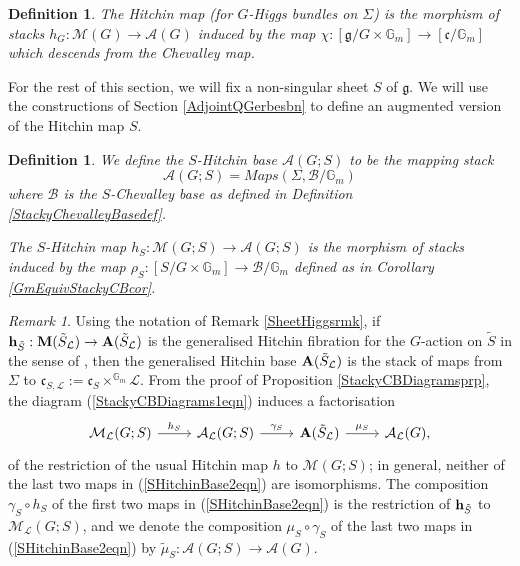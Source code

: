 \documentclass{amsart}
\newtheorem{definition}[theorem]{Definition}
\theoremstyle{remark}
\newtheorem{remark}[theorem]{Remark}
\numberwithin{theorem}{section}
\numberwithin{equation}{section}
\begin{document}
\begin{definition}\label{HitchinMapdef}
    The \emph{Hitchin map} (for $G$-Higgs bundles on $\Sigma$) is the morphism of stacks $h_G:\mathcal M(G) \rightarrow \mathcal A(G)$ induced by the map $\chi:[\mathfrak{g}/G\times \mathbb{G}_m]\rightarrow [\mathfrak{c}/\mathbb{G}_m]$ which descends from the Chevalley map.
\end{definition} 

For the rest of this section, we will fix a non-singular sheet $S$ of $\mathfrak{g}$. We will use the constructions of Section \ref{AdjointQGerbesbn} to define an augmented version of the Hitchin map $S$.

\begin{definition}\label{SHitchinmapdef}
    We define the \emph{$S$-Hitchin base} $\mathcal A (G;S)$ to be the mapping stack
    \begin{equation}\label{SHitchinBase1eqn}
        \mathcal A(G;S) = Maps(\Sigma,\mathcal B/\mathbb{G}_m)
    \end{equation}
    where $\mathcal B$ is the $S$-Chevalley base as defined in Definition \ref{StackyChevalleyBasedef}.

    The \emph{$S$-Hitchin map} $h_S:\mathcal M(G;S) \rightarrow \mathcal A(G;S)$ is the morphism of stacks induced by the map $\rho_S:[S/G\times \mathbb{G}_m] \rightarrow \mathcal B/\mathbb{G}_m$ defined as in Corollary \ref{GmEquivStackyCBcor}.
\end{definition}
\begin{remark}\label{SHitchinBasermk}
     Using the notation of Remark \ref{SheetHiggsrmk}, if ${\bf h}_{\tilde{S}}:{\bf M}(\tilde{S}_\mathcal L) \rightarrow {\bf A}(\tilde{S}_\mathcal L)$ is the generalised Hitchin fibration for the $G$-action on $\tilde{S}$ in the sense of \cite[Section 4.3]{Ngo3}, then the generalised Hitchin base ${\bf A}(\tilde{S}_\mathcal L)$ is the stack of maps from $\Sigma$ to $\mathfrak{c}_{S, \mathcal L} := \mathfrak{c}_S \times^{\mathbb{G}_m} \mathcal L$. From the proof of Proposition \ref{StackyCBDiagramsprp}, the diagram (\ref{StackyCBDiagrams1eqn}) induces a factorisation
     \begin{equation}\label{SHitchinBase2eqn}
        \begin{tikzcd}
            \mathcal M_\mathcal L(G;S) \arrow[r, "h_S"] & \mathcal A_\mathcal L(G;S) \arrow[r, "\gamma_S"] & {\bf A}(\tilde{S}_\mathcal L) \arrow[r, "\mu_S"] & \mathcal A_\mathcal L(G),
        \end{tikzcd}
     \end{equation}
     of the restriction of the usual Hitchin map $h$ to $\mathcal M(G;S)$; in general, neither of the last two maps in (\ref{SHitchinBase2eqn}) are isomorphisms. The composition $\gamma_S \circ h_S$ of the first two maps in (\ref{SHitchinBase2eqn}) is the restriction of ${\bf h}_{\tilde{S}}$ to $\mathcal M_\mathcal L(G;S)$, and we denote the composition $\mu_S \circ \gamma_S$ of the last two maps in (\ref{SHitchinBase2eqn}) by $\tilde{\mu}_S:\mathcal A(G;S) \rightarrow \mathcal A(G)$.
\end{remark}
\end{document}
